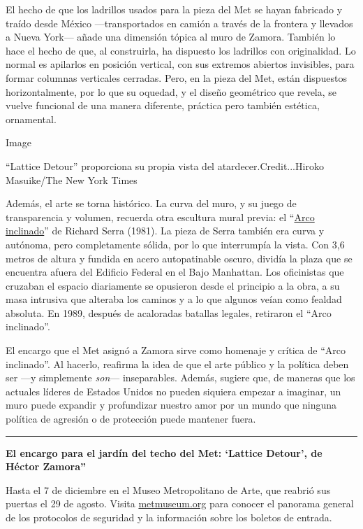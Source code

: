 El hecho de que los ladrillos usados para la pieza del Met se hayan
fabricado y traído desde México ---transportados en camión a través de
la frontera y llevados a Nueva York--- añade una dimensión tópica al
muro de Zamora. También lo hace el hecho de que, al construirla, ha
dispuesto los ladrillos con originalidad. Lo normal es apilarlos en
posición vertical, con sus extremos abiertos invisibles, para formar
columnas verticales cerradas. Pero, en la pieza del Met, están
dispuestos horizontalmente, por lo que su oquedad, y el diseño
geométrico que revela, se vuelve funcional de una manera diferente,
práctica pero también estética, ornamental.

Image

``Lattice Detour'' proporciona su propia vista del
atardecer.Credit...Hiroko Masuike/The New York Times

Además, el arte se torna histórico. La curva del muro, y su juego de
transparencia y volumen, recuerda otra escultura mural previa: el
``\href{https://www.tate.org.uk/art/artists/richard-serra-1923/lost-art-richard-serra}{Arco
inclinado}'' de Richard Serra (1981). La pieza de Serra también era
curva y autónoma, pero completamente sólida, por lo que interrumpía la
vista. Con 3,6 metros de altura y fundida en acero autopatinable oscuro,
dividía la plaza que se encuentra afuera del Edificio Federal en el Bajo
Manhattan. Los oficinistas que cruzaban el espacio diariamente se
opusieron desde el principio a la obra, a su masa intrusiva que alteraba
los caminos y a lo que algunos veían como fealdad absoluta. En 1989,
después de acaloradas batallas legales, retiraron el ``Arco inclinado''.

El encargo que el Met asignó a Zamora sirve como homenaje y crítica de
``Arco inclinado''. Al hacerlo, reafirma la idea de que el arte público
y la política deben ser ---y simplemente \emph{son}--- inseparables.
Además, sugiere que, de maneras que los actuales líderes de Estados
Unidos no pueden siquiera empezar a imaginar, un muro puede expandir y
profundizar nuestro amor por un mundo que ninguna política de agresión o
de protección puede mantener fuera.

\begin{center}\rule{0.5\linewidth}{\linethickness}\end{center}

\textbf{El encargo para el jardín del techo del Met: `Lattice Detour',
de Héctor Zamora''}

Hasta el 7 de diciembre en el Museo Metropolitano de Arte, que reabrió
sus puertas el 29 de agosto. Visita
\href{https://www.metmuseum.org/}{metmuseum.org} para conocer el
panorama general de los protocolos de seguridad y la información sobre
los boletos de entrada.

